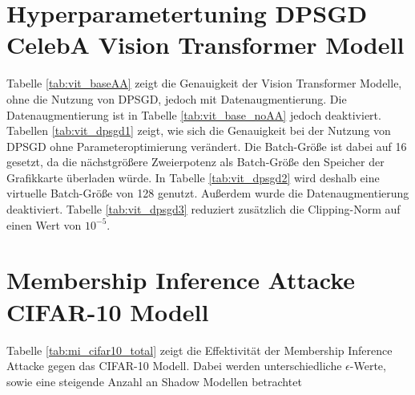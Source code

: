 \section{Hyperparametertuning DPSGD CelebA Vision Transformer Modell}
Tabelle \ref{tab:vit_baseAA} zeigt die Genauigkeit der Vision Transformer Modelle, ohne die Nutzung von DPSGD, jedoch mit Datenaugmentierung.
Die Datenaugmentierung ist in Tabelle \ref{tab:vit_base_noAA} jedoch deaktiviert.
Tabellen \ref{tab:vit_dpsgd1} zeigt, wie sich die Genauigkeit bei der Nutzung von DPSGD ohne Parameteroptimierung verändert. 
Die Batch-Größe ist dabei auf 16 gesetzt, da die nächstgrößere Zweierpotenz als Batch-Größe den Speicher der Grafikkarte überladen würde.
In Tabelle \ref{tab:vit_dpsgd2} wird deshalb eine virtuelle Batch-Größe von 128 genutzt. 
Außerdem wurde die Datenaugmentierung deaktiviert.
Tabelle \ref{tab:vit_dpsgd3} reduziert zusätzlich die Clipping-Norm auf einen Wert von $10^{-5}$.





\clearpage

\section{Membership Inference Attacke CIFAR-10 Modell}
Tabelle \ref{tab:mi_cifar10_total} zeigt die Effektivität der Membership Inference Attacke gegen das CIFAR-10 Modell. 
Dabei werden unterschiedliche $\epsilon$-Werte, sowie eine steigende Anzahl an Shadow Modellen betrachtet
